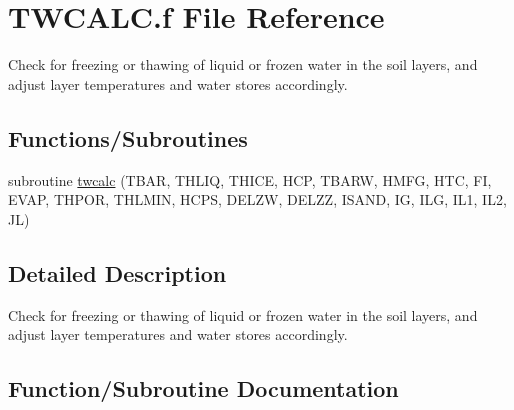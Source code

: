 \hypertarget{TWCALC_8f}{}\section{T\+W\+C\+A\+L\+C.\+f File Reference}
\label{TWCALC_8f}


Check for freezing or thawing of liquid or frozen water in the soil layers, and adjust layer temperatures and water stores accordingly.  


\subsection*{Functions/\+Subroutines}
\begin{DoxyCompactItemize}
\item 
subroutine \hyperlink{TWCALC_8f_a70ccee2822c2cc573ae3aca26942288a}{twcalc} (T\+B\+A\+R, T\+H\+L\+I\+Q, T\+H\+I\+C\+E, H\+C\+P, T\+B\+A\+R\+W, H\+M\+F\+G, H\+T\+C, F\+I, E\+V\+A\+P, T\+H\+P\+O\+R, T\+H\+L\+M\+I\+N, H\+C\+P\+S, D\+E\+L\+Z\+W, D\+E\+L\+Z\+Z, I\+S\+A\+N\+D, I\+G, I\+L\+G, I\+L1, I\+L2, J\+L)
\end{DoxyCompactItemize}


\subsection{Detailed Description}
Check for freezing or thawing of liquid or frozen water in the soil layers, and adjust layer temperatures and water stores accordingly. 



\subsection{Function/\+Subroutine Documentation}
\hypertarget{TWCALC_8f_a70ccee2822c2cc573ae3aca26942288a}{}
